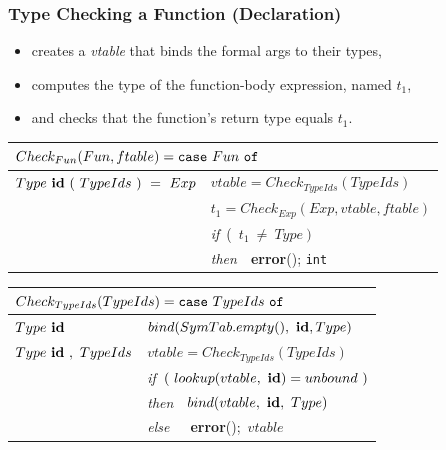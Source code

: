 \documentclass{beamer}
\newcommand{\emp}[1]{\textcolor{DikuRed}{ #1}}
\begin{document}
\begin{frame}
\frametitle{Type Checking a Function (Declaration)}

\begin{itemize}
    \item \emp{creates a {\em vtable} that binds the formal args to their types},
    \item \emp{computes the type of the function-body expression, named $t_1$,}
    \item \emp{and checks that the function's return type equals $t_1$.}
\end{itemize}

\bigskip


\begin{tabular}{|l|l|}\hline
\multicolumn{2}{|l|}{$Check_{Fun}(Fun,ftable)
 = \mbox{\tt case}~Fun~\mbox{\tt of} $} \\\hline

$Type~\mbox{\textbf{id}}~(~TypeIds~)~=~Exp$
        & $vtable = Check_{TypeIds}(TypeIds)$ \\
        & $t_1 = Check_{Exp}(Exp,vtable,ftable)$ \\
        & {\em if}~(~$t_1~\neq~Type~)$ \\
        & {\em then}~~\alert{\bf error}(); {\tt int}\\\hline
\end{tabular}

\bigskip

\begin{tabular}{|l|l|}\hline
\multicolumn{2}{|l|}{$ Check_{TypeIds}(TypeIds)
 = \mbox{\tt case}~TypeIds~\mbox{\tt of} $} \\\hline

$Type~\mbox{\textbf{id}}$
        & $bind(SymTab.empty(),\mbox{~\textbf{id}},Type)$ \\\hline

$Type~\mbox{\textbf{id}}~,~TypeIds$
        & $vtable = Check_{TypeIds}(TypeIds)$ \\
        & {\em if}~$(~lookup(vtable,~\mbox{\textbf{id}}) = unbound~)$ \\
        & {\em then}~~$bind(vtable,~\mbox{\textbf{id}},~Type)$ \\
        & {\em else}~~~\alert{{\bf error}}();~$vtable$ \\\hline
\end{tabular}


\end{frame}
\end{document}

